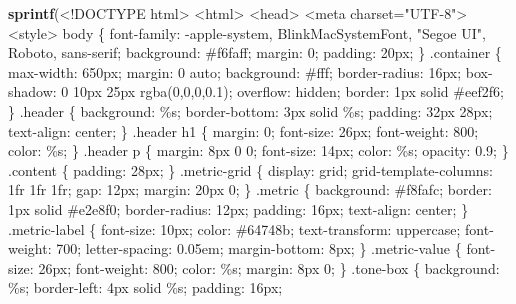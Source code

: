 \documentclass[
]{article}
\newenvironment{Shaded}{\begin{snugshade}}{\end{snugshade}}
\newcommand{\FunctionTok}[1]{\textcolor[rgb]{0.13,0.29,0.53}{\textbf{#1}}}
\newcommand{\NormalTok}[1]{#1}
\newcommand{\StringTok}[1]{\textcolor[rgb]{0.31,0.60,0.02}{#1}}
\begin{document}
\begin{Shaded}
\begin{Highlighting}[]
      \FunctionTok{sprintf}\NormalTok{(}\StringTok{\textquotesingle{}\textless{}!DOCTYPE html\textgreater{}}
\StringTok{\textless{}html\textgreater{}}
\StringTok{\textless{}head\textgreater{}}
\StringTok{  \textless{}meta charset="UTF{-}8"\textgreater{}}
\StringTok{  \textless{}style\textgreater{}}
\StringTok{    body \{}
\StringTok{      font{-}family: {-}apple{-}system, BlinkMacSystemFont, "Segoe UI", Roboto, sans{-}serif;}
\StringTok{      background: \#f6faff;}
\StringTok{      margin: 0;}
\StringTok{      padding: 20px;}
\StringTok{    \}}
\StringTok{    .container \{}
\StringTok{      max{-}width: 650px;}
\StringTok{      margin: 0 auto;}
\StringTok{      background: \#fff;}
\StringTok{      border{-}radius: 16px;}
\StringTok{      box{-}shadow: 0 10px 25px rgba(0,0,0,0.1);}
\StringTok{      overflow: hidden;}
\StringTok{      border: 1px solid \#eef2f6;}
\StringTok{    \}}
\StringTok{    .header \{}
\StringTok{      background: \%s;}
\StringTok{      border{-}bottom: 3px solid \%s;}
\StringTok{      padding: 32px 28px;}
\StringTok{      text{-}align: center;}
\StringTok{    \}}
\StringTok{    .header h1 \{}
\StringTok{      margin: 0;}
\StringTok{      font{-}size: 26px;}
\StringTok{      font{-}weight: 800;}
\StringTok{      color: \%s;}
\StringTok{    \}}
\StringTok{    .header p \{}
\StringTok{      margin: 8px 0 0;}
\StringTok{      font{-}size: 14px;}
\StringTok{      color: \%s;}
\StringTok{      opacity: 0.9;}
\StringTok{    \}}
\StringTok{    .content \{ padding: 28px; \}}
\StringTok{    .metric{-}grid \{}
\StringTok{      display: grid;}
\StringTok{      grid{-}template{-}columns: 1fr 1fr 1fr;}
\StringTok{      gap: 12px;}
\StringTok{      margin: 20px 0;}
\StringTok{    \}}
\StringTok{    .metric \{}
\StringTok{      background: \#f8fafc;}
\StringTok{      border: 1px solid \#e2e8f0;}
\StringTok{      border{-}radius: 12px;}
\StringTok{      padding: 16px;}
\StringTok{      text{-}align: center;}
\StringTok{    \}}
\StringTok{    .metric{-}label \{}
\StringTok{      font{-}size: 10px;}
\StringTok{      color: \#64748b;}
\StringTok{      text{-}transform: uppercase;}
\StringTok{      font{-}weight: 700;}
\StringTok{      letter{-}spacing: 0.05em;}
\StringTok{      margin{-}bottom: 8px;}
\StringTok{    \}}
\StringTok{    .metric{-}value \{}
\StringTok{      font{-}size: 26px;}
\StringTok{      font{-}weight: 800;}
\StringTok{      color: \%s;}
\StringTok{      margin: 8px 0;}
\StringTok{    \}}
\StringTok{    .tone{-}box \{}
\StringTok{      background: \%s;}
\StringTok{      border{-}left: 4px solid \%s;}
\StringTok{      padding: 16px;}

\end{Highlighting}
\end{Shaded}
\end{document}
